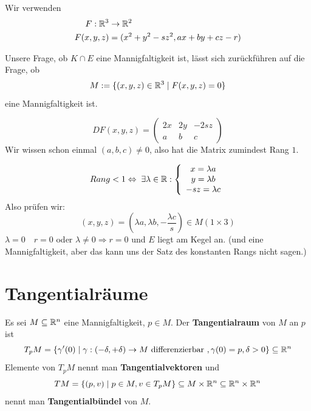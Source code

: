 \documentclass[main.tex]{subfiles}
\begin{document}
\begin{Beispiel}[Kegelschnitte]
\begin{center}
  \end{center}

  Wir verwenden
  $$\begin{aligned}
    F: \mathbb{R}^3 & \to \mathbb{R}^2 \\
    F(x,y,z) & = (x^2 + y^2 -sz^2, ax + by + cz -r)
  \end{aligned}$$

  Unsere Frage, ob $K \cap E$ eine Mannigfaltigkeit ist, lässt sich zurückführen auf die Frage, ob
  $$M := \{(x,y,z) \in \mathbb{R}^3 \mid F(x,y,z) = 0\}$$
  eine Mannigfaltigkeit ist.

  $$DF(x,y,z) = \begin{pmatrix}
    2x & 2y & -2sz \\
    a & b & c
  \end{pmatrix}$$
  Wir wissen schon einmal $(a,b,c) \neq 0$, also hat die Matrix zumindest Rang $1$.

  $$Rang < 1 \Leftrightarrow \;\exists \lambda \in \mathbb{R} : \left \{ \begin{array}{c}
    x = \lambda a \\ y = \lambda b \\ -sz = \lambda c
  \end{array}\right.$$
  Also prüfen wir:
  $$(x,y,z) = \left(\lambda a, \lambda b, -\dfrac{\lambda c}{s}\right) \in M(1 \times 3)$$
  $\lambda = 0 \quad r = 0$ oder $\lambda \neq 0 \Rightarrow r = 0$ und $E$ liegt am Kegel an. (und eine Mannigfaltigkeit, aber das kann uns der Satz des konstanten Rangs nicht sagen.)
\end{Beispiel}

\section{Tangentialräume}

\begin{Definition}[Tangentialraum]
  Es sei $M \subseteq \mathbb{R}^n$ eine Mannigfaltigkeit, $p \in M$. Der \textbf{Tangentialraum} von $M$ an $p$ ist
  $$T_p M = \{\gamma'(0) \mid \gamma: (-\delta,+\delta) \to M \text{ differenzierbar }, \gamma(0) = p, \delta > 0 \} \subseteq \mathbb{R}^n$$
  Elemente von $T_p M$ nennt man \textbf{Tangentialvektoren} und
  $$T M = \{(p,v) \mid p \in M, v \in T_p M\}\subseteq M \times \mathbb{R}^n \subseteq \mathbb{R}^n \times \mathbb{R}^n$$
  nennt man \textbf{Tangentialbündel} von $M$.
\end{Definition}
\end{document}
